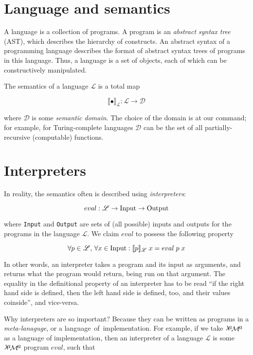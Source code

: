 \documentclass{article}
\author{Dmitry Boulytchev}
\newcommand{\sembr}[1]{\llbracket{#1}\rrbracket}
\newcommand{\lama}{$\lambda\kern -.1667em\lower -.5ex\hbox{$a$}\kern -.1000em\lower .2ex\hbox{$\mathcal M$}\kern -.1000em\lower -.5ex\hbox{$a$}$\xspace}
\theoremstyle{definition}
\begin{document}
  
\section{Language and semantics}

A language is a collection of programs. A program is an \emph{abstract syntax tree} (AST), which describes the hierarchy of constructs. An abstract
syntax of a programming language describes the format of abstract syntax trees of programs in this language. Thus, a language is a set of 
objects, each of which can be constructively manipulated.

The semantics of a language $\mathscr L$ is a total map

\[
\sembr{\bullet}_{\mathscr L} : \mathscr L \to \mathscr D
\]

where $\mathscr D$ is some \emph{semantic domain}. The choice of the domain is at our command; for example, for Turing-complete languages $\mathscr D$ can
be the set of all partially-recursive (computable) functions.

\section{Interpreters}

In reality, the semantics often is described using \emph{interpreters}:

\[
eval : \mathscr L \to \mbox{\lstinline|Input|} \to \mbox{\lstinline|Output|}
\]

where \lstinline|Input| and \lstinline|Output| are sets of (all possible) inputs and outputs for the programs in the language $\mathscr L$. We claim $eval$ to
possess the following property

\[
\forall p \in \mathscr L,\, \forall x\in \mbox{\lstinline|Input|} : \sembr{p}_{\mathscr L}\;x = eval\; p\; x
\]

In other words, an interpreter takes a program and its input as arguments, and returns what the program would return, being run on that
argument. The equality in the definitional property of an interpreter has to be read ``if the right hand side is defined, then the left hand side
is defined, too, and their values coinside'', and vice-versa.

Why interpreters are so important? Because they can be written as programs in a \emph{meta-lanaguge}, or a \mbox{language of implementation}. For example,
if we take \lama as a language of implementation, then an interpreter of a language $\mathscr L$ is some \lama program $eval$, such that
\end{document}
